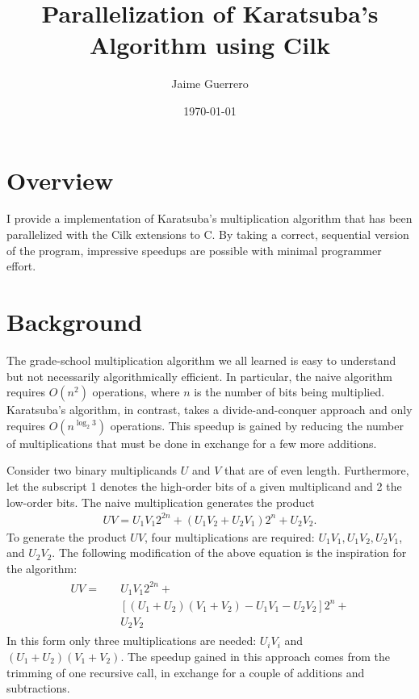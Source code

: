 \documentclass[8pt, twocolumn]{article}
\author{Jaime Guerrero}
\title{Parallelization of Karatsuba's Algorithm using Cilk}
\date{\today}
\begin{document}
\maketitle

\section{Overview}
I provide a implementation of Karatsuba's multiplication algorithm that has
been parallelized with the Cilk extensions to C.  By taking a correct,
sequential version of the program, impressive speedups are possible with
minimal programmer effort.

\section{Background}
The grade-school multiplication algorithm we all learned is easy to understand
but not necessarily algorithmically efficient.  In particular, the naive
algorithm requires $O(n^2)$ operations, where $n$ is the number of bits being
multiplied.  Karatsuba's algorithm, in contrast, takes a divide-and-conquer
approach and only requires $O(n^{\log_2 3})$ operations.  This speedup is gained
by reducing the number of multiplications that must be done in
exchange for a few more additions.

Consider two binary multiplicands $U$ and $V$ that are of even length.
Furthermore, let the subscript 1 denotes the high-order bits of a given
multiplicand and 2 the low-order bits.  The naive multiplication generates the
product
\begin{align}
   UV = U_1 V_1 2^{2n} + (U_1 V_2 + U_2 V_1)2^n + U_2 V_2.
\end{align}
To generate the product $UV$, four multiplications are required: $U_1V_1,
U_1V_2, U_2V_1$, and $U_2 V_2$.  The following modification of the
above equation is the inspiration for the algorithm:
\begin{align}
\begin{split}
UV = \quad & U_1 V_1 2^{2n} + \\ &[(U_1 + U_2)(V_1 + V_2) - U_1 V_1 - U_2 V_2]2^n + \\
     & U_2 V_2
\end{split}
\end{align}
In this form only three multiplications are needed: $U_iV_i$ and $(U_1
+ U_2)(V_1 + V_2)$.  The speedup gained in this approach comes from the trimming
of one recursive call, in exchange for a couple of additions and subtractions.
\end{document}
